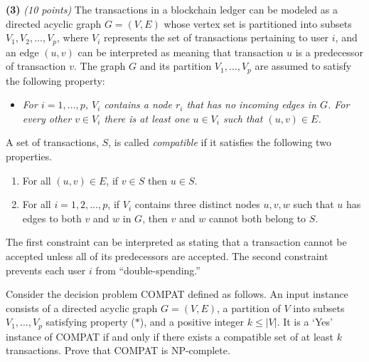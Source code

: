 \documentclass[12pt]{article}
\def\bigap{0.25in}
\begin{document}
\setlength{\parindent}{0in}
\addtolength{\parskip}{0.1cm}
\setlength{\fboxrule}{.5mm}\setlength{\fboxsep}{1.2mm}
\newlength{\boxlength}\setlength{\boxlength}{\textwidth}
\addtolength{\boxlength}{-4mm}
\begin{center}
\end{center}
\vspace{5mm}
\vskip \bigap
{\bf (3)} {\em (10 points)} The transactions in a blockchain ledger can be modeled as a directed acyclic graph $G=(V,E)$ whose vertex set is partitioned into subsets $V_1,V_2,\ldots,V_p$, where $V_i$ represents the set of transactions pertaining to user $i$, and an edge $(u,v)$ can be interpreted as meaning that transaction $u$ is a predecessor of transaction $v$. The graph $G$ and its partition $V_1,\ldots,V_p$ are assumed to satisfy the following property:
\begin{itemize}[($\ast$)]
  \item {\em For $i=1,\ldots,p$, $V_i$ contains a node $r_i$ that has
    no incoming edges in $G$. For every other $v \in V_i$ there is at least one
    $u \in V_i$ such that $(u,v) \in E$.}
\end{itemize}
A set of transactions, $S$, is called {\em compatible} if it satisfies the following two properties.
\begin{enumerate}
  \item For all $(u,v) \in E$, if $v \in S$ then $u \in S$.
  \item For all $i = 1,2,\ldots,p$, if $V_i$ contains three distinct nodes $u,v,w$ such that
    $u$ has edges to both $v$ and $w$ in $G$, then $v$ and $w$ cannot both belong to $S$.
\end{enumerate}
The first constraint can be interpreted as stating that a transaction cannot be accepted
unless all of its predecessors are accepted. The second constraint prevents each user $i$
from ``double-spending.''

Consider the decision problem COMPAT defined as follows. An input instance consists of a directed acyclic
graph $G=(V,E)$, a partition of $V$ into subsets $V_1,\ldots, V_p$ satisfying property ($\ast$), and a
positive integer $k \le |V|$. It is a `Yes' instance of COMPAT if and only if there exists a compatible
set of at least $k$ transactions. Prove that COMPAT is NP-complete.


\end{document}
